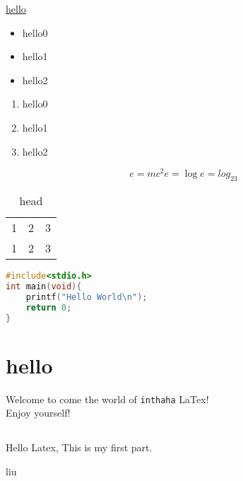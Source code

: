 \documentclass{article}
\author{liukanglai}
\begin{document}
\tableofcontents

\underline{hello}


\begin{itemize}
    \item hello0
    \item hello1
    \item hello2
\end{itemize}

\begin{enumerate}
    \item hello0
    \item hello1
    \item hello2
\end{enumerate}


\begin{equation}
    e=mc^2
    e = \log
    e = log_23
\end{equation}


\begin{table}[h!]
    \centering
    \begin{tabular}{|c|c|c|}
        1 & 2 & 3\\
        1 & 2 & 3\\ 
    \end{tabular}
    \caption{head}
\end{table}

\begin{lstlisting}[language=c]
#include<stdio.h>
int main(void){
    printf("Hello World\n");
    return 0;
}
\end{lstlisting}

\section{hello}
Welcome to come the world of \lstinline{inthaha} LaTex!
\\Enjoy yourself!
\subsection{}
\subsubsection{}

Hello Latex, This is my first part.


liu
\end{document}
